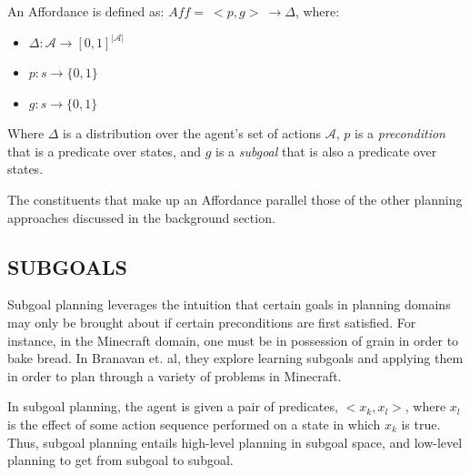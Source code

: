 \documentclass[]{article}
\begin{document}

An Affordance is defined as: $Aff =\ <p,g>\ \longrightarrow \Delta$, where:

\begin{itemize}
\item[] $\Delta : \mathcal{A} \longrightarrow [0,1]^{|\mathcal{A}|}$
\item[] $p : s \longrightarrow \{$0$, 1\}$
\item[] $g : s \longrightarrow \{$0$,1\}$
\end{itemize}

Where $\Delta$ is a distribution over the agent's set of actions $\mathcal{A}$, $p$ is a {\it precondition} that is a predicate over states, and $g$ is a {\it subgoal} that is also a predicate over states.

The constituents that make up an Affordance parallel those of the other planning approaches discussed in the background section.

\subsection{SUBGOALS}
Subgoal planning leverages the intuition that certain goals in planning domains may only be brought about if certain preconditions are first satisfied. For instance, in the Minecraft domain, one must be in possession of grain in order to bake bread. In Branavan et. al, they explore learning subgoals and applying them in order to plan through a variety of problems in Minecraft.

In subgoal planning, the agent is given a pair of predicates, $<x_k, x_l >$, where $x_l$ is the effect of some action sequence performed on a state in which $x_k$ is true. Thus, subgoal planning entails high-level planning in subgoal space, and low-level planning to get from subgoal to subgoal.
\end{document}
